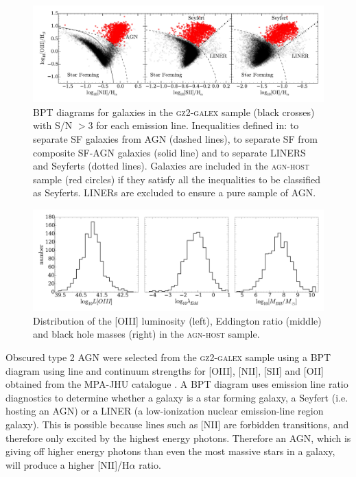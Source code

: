 \begin{figure}
\includegraphics[width=\textwidth]{agn/fig2.pdf}
\caption[BPT diagram used to select AGN host galaxies]{BPT diagrams for galaxies in the \textsc{gz2-galex} sample (black crosses) with S/N $> 3$ for each emission line. Inequalities defined in: \protect\cite{kewley01} to separate SF galaxies from AGN (dashed lines), \protect\cite{kauffmann03b} to separate SF from composite SF-AGN galaxies (solid line) and \protect\cite{kewley06} to separate LINERS and Seyferts (dotted lines).  Galaxies are included in the \textsc{agn-host} sample (red circles) if they satisfy all the inequalities to be classified as Seyferts. LINERs are excluded to ensure a pure sample of AGN.}
\label{bpt}
\end{figure}

\begin{figure}
\includegraphics[width=\textwidth]{agn/agn-host_distributions_loiii_edd_ratio_mbh.pdf}
\caption[Distribution of measured galaxy parameters in the \textsc{agn-host} sample]{Distribution of the [OIII] luminosity (left), Eddington ratio (middle) and black hole masses (right) in the \textsc{agn-host} sample.}
\label{fig:agndistributions}
\end{figure}


Obscured type 2 AGN were selected from the \textsc{gz2-galex} sample using a BPT diagram \citep*{bpt} using line and continuum strengths for [OIII], [NII], [SII] and [OII] obtained from the MPA-JHU catalogue \citep{kauffmann03, brinchmann04}. A BPT diagram uses emission line ratio diagnostics to determine whether a galaxy is a star forming galaxy, a Seyfert (i.e. hosting an AGN) or a LINER (a low-ionization nuclear emission-line region galaxy). This is possible because lines such as [NII] are forbidden transitions, and therefore only excited by the highest energy photons. Therefore an AGN, which is giving off higher energy photons than even the most massive stars in a galaxy, will produce a higher [NII]/H$\alpha$ ratio. 

